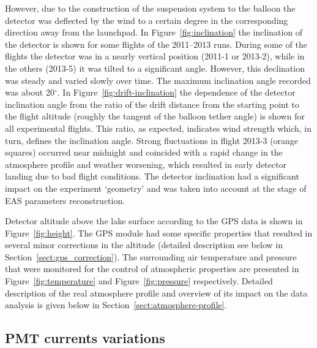 \documentclass[universe,article,submit,moreauthors,pdftex]{Definitions/mdpi}
\begin{document}
\begin{paracol}{2}
However, due to the construction of the suspension system to the balloon the detector was deflected by the wind to a certain degree in the corresponding direction away from the launchpad. In Figure~\ref{fig:inclination} the inclination of the detector is shown for some flights of the 2011--2013 runs. During some of the flights the detector was in a nearly vertical position (2011-1 or 2013-2), while in the others (2013-5) it was tilted to a significant angle. However, this declination was steady and varied slowly over time. The maximum inclination angle recorded was about 20$^\circ$. In Figure~\ref{fig:drift-inclination} the dependence of the detector inclination angle from the ratio of the drift distance from the starting point to the flight altitude (roughly the tangent of the balloon tether angle) is shown for all experimental flights. This ratio, as expected, indicates wind strength which, in turn, defines the inclination angle. Strong fluctuations in flight 2013-3 (orange squares) occurred near midnight and coincided with a rapid change in the atmosphere profile and weather worsening, which resulted in early detector landing due to bad flight conditions. The detector inclination had a significant impact on the experiment `geometry' and was taken into account at the stage of EAS parameters reconstruction.

Detector altitude above the lake surface according to the GPS data is shown in Figure~\ref{fig:height}. The GPS module had some specific properties that resulted in several minor corrections in the altitude (detailed description see below in Section~\ref{sect:gps_correction}). The surrounding air temperature and pressure that were monitored for the control of atmospheric properties are presented in Figure~\ref{fig:temperature} and Figure~\ref{fig:pressure} respectively. Detailed description of the real atmosphere profile and overview of its impact on the data analysis is given below in Section~\ref{sect:atmosphere-profile}.



\subsection{PMT currents variations}


\end{paracol}
\end{document}
